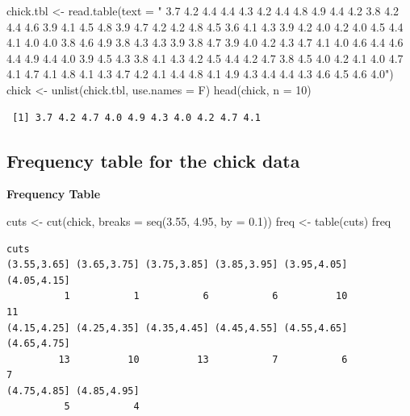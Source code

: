 \documentclass[
  letterpaper,
  DIV=11,
  numbers=noendperiod]{scrartcl}
\newenvironment{Shaded}{\begin{snugshade}}{\end{snugshade}}
\newcommand{\AttributeTok}[1]{\textcolor[rgb]{0.40,0.45,0.13}{#1}}
\newcommand{\DecValTok}[1]{\textcolor[rgb]{0.68,0.00,0.00}{#1}}
\newcommand{\FloatTok}[1]{\textcolor[rgb]{0.68,0.00,0.00}{#1}}
\newcommand{\FunctionTok}[1]{\textcolor[rgb]{0.28,0.35,0.67}{#1}}
\newcommand{\NormalTok}[1]{\textcolor[rgb]{0.00,0.23,0.31}{#1}}
\newcommand{\OtherTok}[1]{\textcolor[rgb]{0.00,0.23,0.31}{#1}}
\newcommand{\StringTok}[1]{\textcolor[rgb]{0.13,0.47,0.30}{#1}}
\begin{document}
\begin{Shaded}
\begin{Highlighting}[]
\NormalTok{chick.tbl }\OtherTok{\textless{}{-}} \FunctionTok{read.table}\NormalTok{(}\AttributeTok{text =} \StringTok{"}
\StringTok{               3.7   4.2   4.4   4.4   4.3   4.2   4.4   4.8   4.9   4.4}
\StringTok{    4.2   3.8   4.2   4.4   4.6   3.9   4.1   4.5   4.8   3.9}
\StringTok{    4.7   4.2   4.2   4.8   4.5   3.6   4.1   4.3   3.9   4.2}
\StringTok{    4.0   4.2   4.0   4.5   4.4   4.1   4.0   4.0   3.8   4.6}
\StringTok{    4.9   3.8   4.3   4.3   3.9   3.8   4.7   3.9   4.0   4.2}
\StringTok{    4.3   4.7   4.1   4.0   4.6   4.4   4.6   4.4   4.9   4.4}
\StringTok{    4.0   3.9   4.5   4.3   3.8   4.1   4.3   4.2   4.5   4.4}
\StringTok{    4.2   4.7   3.8   4.5   4.0   4.2   4.1   4.0   4.7   4.1}
\StringTok{    4.7   4.1   4.8   4.1   4.3   4.7   4.2   4.1   4.4   4.8}
\StringTok{    4.1   4.9   4.3   4.4   4.4   4.3   4.6   4.5   4.6   4.0"}\NormalTok{)}
\NormalTok{chick }\OtherTok{\textless{}{-}} \FunctionTok{unlist}\NormalTok{(chick.tbl, }\AttributeTok{use.names =}\NormalTok{ F)}
\FunctionTok{head}\NormalTok{(chick, }\AttributeTok{n =} \DecValTok{10}\NormalTok{)}
\end{Highlighting}
\end{Shaded}

\begin{verbatim}
 [1] 3.7 4.2 4.7 4.0 4.9 4.3 4.0 4.2 4.7 4.1
\end{verbatim}

\subsection{Frequency table for the chick
data}\label{frequency-table-for-the-chick-data}

\textbf{Frequency Table}

\begin{Shaded}
\begin{Highlighting}[]
\NormalTok{cuts }\OtherTok{\textless{}{-}} \FunctionTok{cut}\NormalTok{(chick, }\AttributeTok{breaks =} \FunctionTok{seq}\NormalTok{(}\FloatTok{3.55}\NormalTok{, }\FloatTok{4.95}\NormalTok{, }\AttributeTok{by =} \FloatTok{0.1}\NormalTok{))}
\NormalTok{freq }\OtherTok{\textless{}{-}} \FunctionTok{table}\NormalTok{(cuts)}
\NormalTok{freq}
\end{Highlighting}
\end{Shaded}

\begin{verbatim}
cuts
(3.55,3.65] (3.65,3.75] (3.75,3.85] (3.85,3.95] (3.95,4.05] (4.05,4.15] 
          1           1           6           6          10          11 
(4.15,4.25] (4.25,4.35] (4.35,4.45] (4.45,4.55] (4.55,4.65] (4.65,4.75] 
         13          10          13           7           6           7 
(4.75,4.85] (4.85,4.95] 
          5           4 
\end{verbatim}
\end{document}
